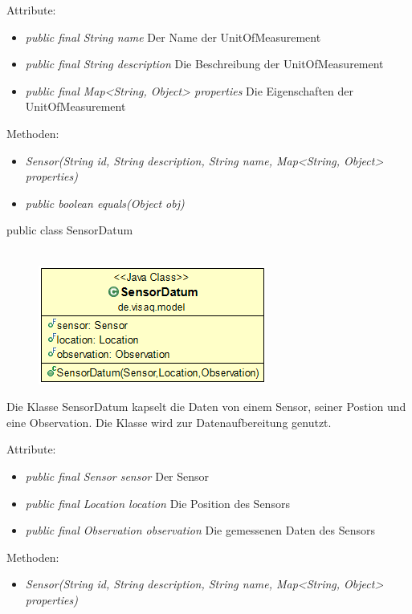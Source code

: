 Attribute:
\begin{itemize} 
	\item \emph{public final String name} Der Name der UnitOfMeasurement
	\item \emph{public final String description} Die Beschreibung der UnitOfMeasurement
	\item \emph{public final Map<String, Object> properties} Die Eigenschaften der UnitOfMeasurement
\end{itemize}
Methoden:
\begin{itemize} 
	\item \emph{Sensor(String id, String description, String name, Map<String, Object> properties)} 
	\item \emph{public boolean equals(Object obj)} 
\end{itemize}


public class SensorDatum
\\\\
\begin{minipage}{0.3\textwidth}
	\begin{figure}[H]
		\includegraphics[scale = 0.5
		]{media/frontend/model/SensorDatumClass.png}
	\end{figure}
\end{minipage} \hfill
\begin{minipage}{0.6\textwidth}
	Die Klasse SensorDatum kapselt die Daten von einem Sensor, seiner Postion und eine Observation. Die Klasse wird zur Datenaufbereitung genutzt.
\end{minipage}

Attribute:
\begin{itemize} 
	\item \emph{public final Sensor sensor} Der Sensor
	\item \emph{public final Location location} Die Position des Sensors
	\item \emph{public final Observation observation} Die gemessenen Daten des Sensors
\end{itemize}
Methoden:
\begin{itemize} 
	\item \emph{Sensor(String id, String description, String name, Map<String, Object> properties)} 
\end{itemize}
